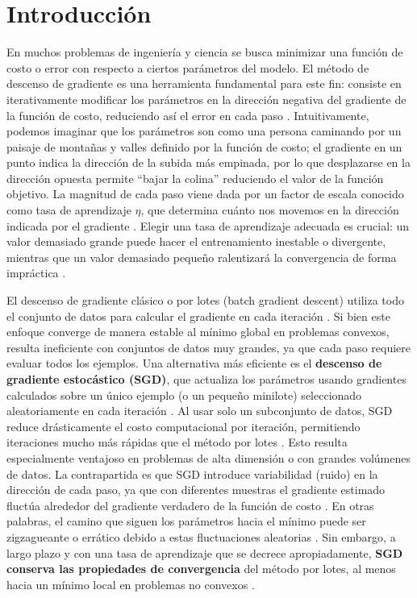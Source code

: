 \documentclass[12pt, spanish]{article}
\begin{document}
\section{Introducción}
En muchos problemas de ingeniería y ciencia se busca minimizar una función de costo o error con respecto a ciertos parámetros del modelo. El método de descenso de gradiente es una herramienta fundamental para este fin: consiste en iterativamente modificar los parámetros en la dirección negativa del gradiente de la función de costo, reduciendo así el error en cada paso \cite{ref1,ref2}. Intuitivamente, podemos imaginar que los parámetros son como una persona caminando por un paisaje de montañas y valles definido por la función de costo; el gradiente en un punto indica la dirección de la subida más empinada, por lo que desplazarse en la dirección opuesta permite “bajar la colina” reduciendo el valor de la función objetivo. La magnitud de cada paso viene dada por un factor de escala conocido como tasa de aprendizaje $\eta$, que determina cuánto nos movemos en la dirección indicada por el gradiente \cite{ref3,ref4}. Elegir una tasa de aprendizaje adecuada es crucial: un valor demasiado grande puede hacer el entrenamiento inestable o divergente, mientras que un valor demasiado pequeño ralentizará la convergencia de forma impráctica \cite{ref4}.

El descenso de gradiente clásico o por lotes (batch gradient descent) utiliza todo el conjunto de datos para calcular el gradiente en cada iteración \cite{ref5}. Si bien este enfoque converge de manera estable al mínimo global en problemas convexos, resulta ineficiente con conjuntos de datos muy grandes, ya que cada paso requiere evaluar todos los ejemplos. Una alternativa más eficiente es el \textbf{descenso de gradiente estocástico (SGD)}, que actualiza los parámetros usando gradientes calculados sobre un único ejemplo (o un pequeño minilote) seleccionado aleatoriamente en cada iteración \cite{ref6,ref7}. Al usar solo un subconjunto de datos, SGD reduce drásticamente el costo computacional por iteración, permitiendo iteraciones mucho más rápidas que el método por lotes \cite{ref6}. Esto resulta especialmente ventajoso en problemas de alta dimensión o con grandes volúmenes de datos. La contrapartida es que SGD introduce variabilidad (ruido) en la dirección de cada paso, ya que con diferentes muestras el gradiente estimado fluctúa alrededor del gradiente verdadero de la función de costo \cite{ref7}. En otras palabras, el camino que siguen los parámetros hacia el mínimo puede ser zigzagueante o errático debido a estas fluctuaciones aleatorias \cite{ref8}. Sin embargo, a largo plazo y con una tasa de aprendizaje que se decrece apropiadamente, \textbf{SGD conserva las propiedades de convergencia} del método por lotes, al menos hacia un mínimo local en problemas no convexos \cite{ref9}.
\end{document}
